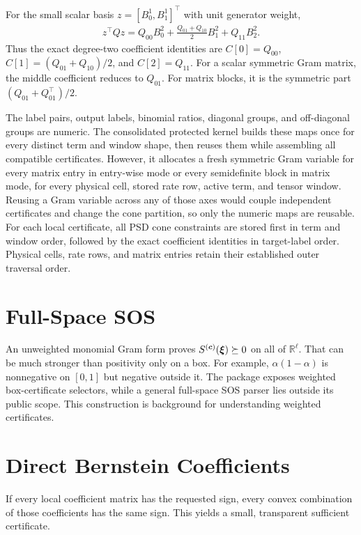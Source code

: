 For the small scalar basis $z=[B_0^1,B_1^1]^\top$ with unit generator weight,
\begin{gather*}
z^\top Qz
=Q_{00}B_0^2+\frac{Q_{01}+Q_{10}}{2}B_1^2+Q_{11}B_2^2.
\end{gather*}
Thus the exact degree-two coefficient identities are $C[0]=Q_{00}$, $C[1]=(Q_{01}+Q_{10})/2$, and $C[2]=Q_{11}$. For a scalar symmetric Gram matrix, the middle coefficient reduces to $Q_{01}$. For matrix blocks, it is the symmetric part $(Q_{01}+Q_{01}^\top)/2$.

The label pairs, output labels, binomial ratios, diagonal groups, and off-diagonal groups are numeric. The consolidated protected  kernel builds these maps once for every distinct term and window shape, then reuses them while assembling all compatible certificates. However, it allocates a fresh symmetric Gram variable for every matrix entry in entry-wise mode or every semidefinite block in matrix mode, for every physical cell, stored rate row, active term, and tensor window. Reusing a Gram variable across any of those axes would couple independent certificates and change the cone partition, so only the numeric maps are reusable. For each local certificate, all PSD cone constraints are stored first in term and window order, followed by the exact coefficient identities in target-label order. Physical cells, rate rows, and matrix entries retain their established outer traversal order.

\section{Full-Space SOS}

An unweighted monomial Gram form proves $S^{(\boldsymbol{c})}(\boldsymbol{\xi})\succeq0$ on all of $\mathbb R^\ell$. That can be much stronger than positivity only on a box. For example, $\alpha(1-\alpha)$ is nonnegative on $[0,1]$ but negative outside it. The package exposes weighted box-certificate selectors, while a general full-space SOS parser lies outside its public scope. This construction is background for understanding weighted certificates.

\section{Direct Bernstein Coefficients}
\label{sec:certificate-direct}

If every local coefficient matrix has the requested sign, every convex combination of those coefficients has the same sign. This yields a small, transparent sufficient certificate.

